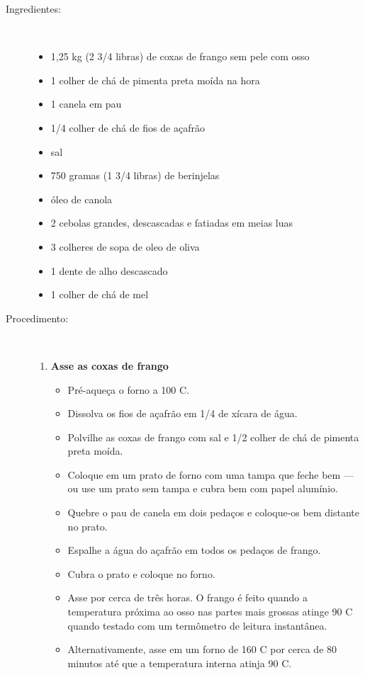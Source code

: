 \documentclass [11pt, papel de carta] {article}
\begin{document}
\begin {description}

\item [Ingredientes:] \ \\
\begin {itemize}
\item 1,25 kg (2 3/4 libras) de coxas de frango sem pele com osso
\item 1 colher de chá de pimenta preta moída na hora
\item 1 canela em pau
\item 1/4 colher de chá de fios de açafrão
\item sal
\item 750 gramas (1 3/4 libras) de berinjelas
\item óleo de canola
\item 2 cebolas grandes, descascadas e fatiadas em meias luas
\item 3 colheres de sopa de oleo de oliva
\item 1 dente de alho descascado
\item 1 colher de chá de mel
\end {itemize}
\item [Procedimento:] \ \\
\begin {enumerate}
\item {\bf Asse as coxas de frango}
\begin {itemize}
\item Pré-aqueça o forno a 100 C.
\item Dissolva os fios de açafrão em 1/4 de xícara de água.
\item Polvilhe as coxas de frango com sal e 1/2 colher de chá de pimenta preta moída.
\item Coloque em um prato de forno com uma tampa que feche bem --- ou use um prato sem tampa e cubra bem com papel alumínio.
\item Quebre o pau de canela em dois pedaços e coloque-os bem distante no prato.
\item Espalhe a água do açafrão em todos os pedaços de frango.
\item Cubra o prato e coloque no forno.
\item Asse por cerca de três horas. O frango é feito quando a temperatura próxima ao osso nas partes mais grossas atinge 90 C quando testado com um termômetro de leitura instantânea.
\item Alternativamente, asse em um forno de 160 C por cerca de 80 minutos até que a temperatura interna atinja 90 C.

\end{itemize}
\end{enumerate}
\end{description}
\end{document}

